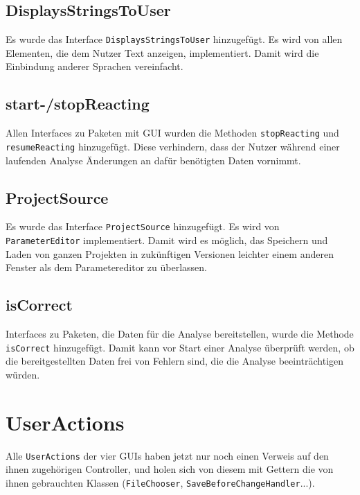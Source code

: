 \documentclass[a4paper]{scrreprt}
\begin{document}
\subsection{DisplaysStringsToUser}
Es wurde das Interface \verb!DisplaysStringsToUser! hinzugefügt. Es wird von allen Elementen, die dem Nutzer Text anzeigen, implementiert. Damit wird die Einbindung anderer Sprachen vereinfacht. \\

\subsection{start-/stopReacting}
Allen Interfaces zu Paketen mit GUI wurden die Methoden \verb!stopReacting! und \verb!resumeReacting! hinzugefügt. Diese verhindern, dass der Nutzer während einer laufenden Analyse Änderungen an dafür benötigten Daten vornimmt. \\

\subsection{ProjectSource}
Es wurde das Interface \verb!ProjectSource! hinzugefügt. Es wird von \verb!ParameterEditor! implementiert. Damit wird es möglich, das Speichern und Laden von ganzen Projekten in zukünftigen Versionen leichter einem anderen Fenster als dem Parametereditor zu überlassen. \\
\subsection{isCorrect}
Interfaces zu Paketen, die Daten für die Analyse bereitstellen, wurde die Methode \verb!isCorrect! hinzugefügt. Damit kann vor Start einer Analyse überprüft werden, ob die bereitgestellten Daten frei von Fehlern sind, die die Analyse beeinträchtigen würden.

\section{UserActions}
Alle \verb!UserActions! der vier GUIs haben jetzt nur noch einen Verweis auf den ihnen zugehörigen Controller, und holen sich von diesem mit Gettern die von ihnen gebrauchten Klassen (\verb!FileChooser!, \verb!SaveBeforeChangeHandler!...).
\end{document}
